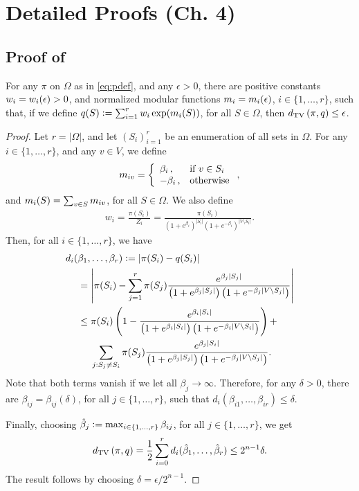 \chapter{Detailed Proofs (Ch. 4)}

\section{Proof of }

\setcounter{lemma}{0}
\begin{prop}
  For any $\pi$ on $\Omega$ as in \eqref{eq:pdef}, and any $\epsilon > 0$, there are positive constants $w_i = w_i(\epsilon) > 0$, and normalized modular functions $m_i = m_i(\epsilon)$, $i \in \{1, \ldots, r\}$, such that, if we define $q(S) \vcentcolon= \sum_{i = 1}^r w_i \exp(m_i(S))$, for all $S \in \Omega$, then $d_{\textrm{TV}}\left( \pi, q \right) \leq \epsilon$.
\end{prop}

\begin{proof}
  Let $r = |\Omega|$, and let $\left( S_i \right)_{i = 1}^r$ be an enumeration of all sets in $\Omega$.
  For any $i \in \{1, \ldots, r\}$, and any $v \in V$, we define
  \begin{align*}
    m_{iv} = \left\{ \begin{array}{ll} \beta_i\,,& \mbox{if } v \in S_i \\ -\beta_i\,,& \mbox{otherwise} \end{array} \right.,
  \end{align*}
  and $m_i(S) = \sum_{v \in S} m_{iv}$, for all $S \in \Omega$.
  We also define
  \begin{align*}
    w_i = \frac{\pi(S_i)}{Z_i} = \frac{\pi(S_i)}{\left(1 + e^{\beta_i}\right)^{|S_i|}\left(1 + e^{-\beta_i}\right)^{|V \setminus S_i|}}.
  \end{align*}
  Then, for all $i \in \{1, \ldots, r\}$, we have
  \begin{align*}
    d_i(&\beta_1, \ldots, \beta_r) \vcentcolon= |\pi(S_i) - q(S_i)| \\
      &= \left| \pi(S_i) - \sum_{j = 1}^r \pi(S_j) \frac{e^{\beta_j|S_j|}}{\left( 1 + e^{\beta_j|S_j|} \right) \left( 1 + e^{-\beta_j|V \setminus S_j|} \right)} \right| \\
      &\leq \pi(S_i) \left( 1 - \frac{e^{\beta_i|S_i|}}{\left( 1 + e^{\beta_i|S_i|} \right) \left( 1 + e^{-\beta_i|V \setminus S_i|} \right)} \right) +\\
      &\ \ \ \ \sum_{j : S_j \neq S_i} \pi(S_j) \frac{e^{\beta_j|S_i|}}{\left( 1 + e^{\beta_j|S_j|} \right) \left( 1 + e^{-\beta_j|V \setminus S_j|} \right)}.
  \end{align*}
  Note that both terms vanish if we let all $\beta_j \to \infty$.
  Therefore, for any $\delta > 0$, there are $\beta_{ij} = \beta_{ij}(\delta)$, for all $j \in \{1, \ldots, r\}$, such that $d_i(\beta_{i1}, \ldots, \beta_{ir}) \leq \delta$.
  
  Finally, choosing $\hat{\beta}_j \vcentcolon= \max_{i \in \{1, \ldots, r\}} \beta_{ij}$, for all $j \in \{1, \ldots, r\}$, we get
  \begin{align*}
    d_{\textrm{TV}}\left( \pi, q \right) = \frac{1}{2}\sum_{i = 0}^r d_i(\hat{\beta}_1, \ldots, \hat{\beta}_r) \leq 2^{n-1} \delta.
  \end{align*}
  The result follows by choosing $\delta = \epsilon / 2^{n-1}$.
\end{proof}

